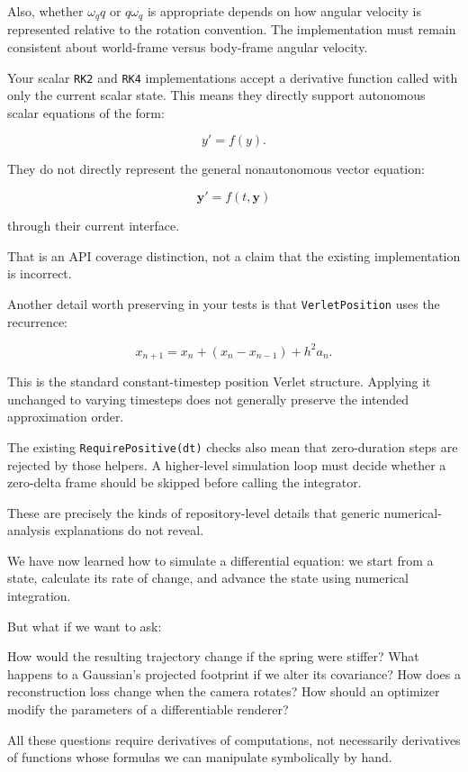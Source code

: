 Also, whether \(\omega_q q\) or \(q\omega_q\) is appropriate depends on how angular velocity is represented relative to the rotation convention. The implementation must remain consistent about world-frame versus body-frame angular velocity.

Your scalar \texttt{RK2} and \texttt{RK4} implementations accept a derivative function called with only the current scalar state. This means they directly support autonomous scalar equations of the form:

\[
y'=f(y).
\]

They do not directly represent the general nonautonomous vector equation:

\[
\mathbf y'=f(t,\mathbf y)
\]

through their current interface.

That is an API coverage distinction, not a claim that the existing implementation is incorrect.

Another detail worth preserving in your tests is that \texttt{VerletPosition} uses the recurrence:

\[
x_{n+1}=x_n+(x_n-x_{n-1})+h^2a_n.
\]

This is the standard constant-timestep position Verlet structure. Applying it unchanged to varying timesteps does not generally preserve the intended approximation order.

The existing \texttt{RequirePositive(dt)} checks also mean that zero-duration steps are rejected by those helpers. A higher-level simulation loop must decide whether a zero-delta frame should be skipped before calling the integrator.

These are precisely the kinds of repository-level details that generic numerical-analysis explanations do not reveal.

We have now learned how to simulate a differential equation: we start from a state, calculate its rate of change, and advance the state using numerical integration.

But what if we want to ask:

How would the resulting trajectory change if the spring were stiffer? What happens to a Gaussian's projected footprint if we alter its covariance? How does a reconstruction loss change when the camera rotates? How should an optimizer modify the parameters of a differentiable renderer?

All these questions require derivatives of computations, not necessarily derivatives of functions whose formulas we can manipulate symbolically by hand.

